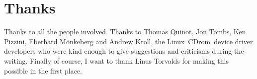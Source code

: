 \documentclass{article}
\def\linux{{\sc Linux}}
\def\cdrom{{\sc CDrom}}
\begin{document}
\section{Thanks}

Thanks to all the people involved. Thanks to Thomas Quinot, Jon Tombs,
Ken Pizzini, Eberhard M\"onkeberg and Andrew Kroll, the \linux\ 
\cdrom\ device driver developers who were kind enough to give
suggestions and criticisms during the writing. Finally of course, I
want to thank Linus Torvalds for making this possible in the first
place.
\end{document}
